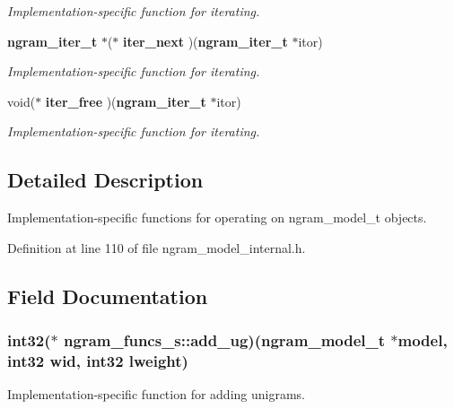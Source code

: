 \begin{DoxyCompactItemize}
\begin{DoxyCompactList}\small\item\em \-Implementation-\/specific function for iterating. \end{DoxyCompactList}\item 
{\bf ngram\-\_\-iter\-\_\-t} $\ast$($\ast$ {\bf iter\-\_\-next} )({\bf ngram\-\_\-iter\-\_\-t} $\ast$itor)\label{structngram__funcs__s_a57777056985f8adc3494e859c1102f3e}

\begin{DoxyCompactList}\small\item\em \-Implementation-\/specific function for iterating. \end{DoxyCompactList}\item 
void($\ast$ {\bf iter\-\_\-free} )({\bf ngram\-\_\-iter\-\_\-t} $\ast$itor)\label{structngram__funcs__s_ad7031e996c16516cf7f52e7a4adee4bb}

\begin{DoxyCompactList}\small\item\em \-Implementation-\/specific function for iterating. \end{DoxyCompactList}\end{DoxyCompactItemize}


\subsection{\-Detailed \-Description}
\-Implementation-\/specific functions for operating on ngram\-\_\-model\-\_\-t objects. 

\-Definition at line 110 of file ngram\-\_\-model\-\_\-internal.\-h.



\subsection{\-Field \-Documentation}
\subsubsection[{add\-\_\-ug}]{\setlength{\rightskip}{0pt plus 5cm}int32($\ast$ {\bf ngram\-\_\-funcs\-\_\-s\-::add\-\_\-ug})({\bf ngram\-\_\-model\-\_\-t} $\ast$model, int32 wid, int32 lweight)}\label{structngram__funcs__s_a6d553c95c7f4da4993f2b9df757ac016}


\-Implementation-\/specific function for adding unigrams. 

